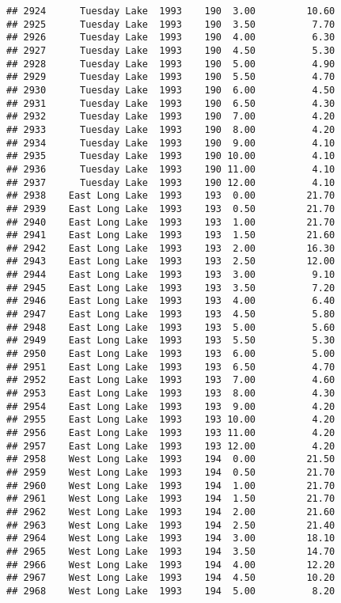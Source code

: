 \documentclass[
]{article}
\begin{document}
\begin{verbatim}
## 2924      Tuesday Lake  1993    190  3.00         10.60
## 2925      Tuesday Lake  1993    190  3.50          7.70
## 2926      Tuesday Lake  1993    190  4.00          6.30
## 2927      Tuesday Lake  1993    190  4.50          5.30
## 2928      Tuesday Lake  1993    190  5.00          4.90
## 2929      Tuesday Lake  1993    190  5.50          4.70
## 2930      Tuesday Lake  1993    190  6.00          4.50
## 2931      Tuesday Lake  1993    190  6.50          4.30
## 2932      Tuesday Lake  1993    190  7.00          4.20
## 2933      Tuesday Lake  1993    190  8.00          4.20
## 2934      Tuesday Lake  1993    190  9.00          4.10
## 2935      Tuesday Lake  1993    190 10.00          4.10
## 2936      Tuesday Lake  1993    190 11.00          4.10
## 2937      Tuesday Lake  1993    190 12.00          4.10
## 2938    East Long Lake  1993    193  0.00         21.70
## 2939    East Long Lake  1993    193  0.50         21.70
## 2940    East Long Lake  1993    193  1.00         21.70
## 2941    East Long Lake  1993    193  1.50         21.60
## 2942    East Long Lake  1993    193  2.00         16.30
## 2943    East Long Lake  1993    193  2.50         12.00
## 2944    East Long Lake  1993    193  3.00          9.10
## 2945    East Long Lake  1993    193  3.50          7.20
## 2946    East Long Lake  1993    193  4.00          6.40
## 2947    East Long Lake  1993    193  4.50          5.80
## 2948    East Long Lake  1993    193  5.00          5.60
## 2949    East Long Lake  1993    193  5.50          5.30
## 2950    East Long Lake  1993    193  6.00          5.00
## 2951    East Long Lake  1993    193  6.50          4.70
## 2952    East Long Lake  1993    193  7.00          4.60
## 2953    East Long Lake  1993    193  8.00          4.30
## 2954    East Long Lake  1993    193  9.00          4.20
## 2955    East Long Lake  1993    193 10.00          4.20
## 2956    East Long Lake  1993    193 11.00          4.20
## 2957    East Long Lake  1993    193 12.00          4.20
## 2958    West Long Lake  1993    194  0.00         21.50
## 2959    West Long Lake  1993    194  0.50         21.70
## 2960    West Long Lake  1993    194  1.00         21.70
## 2961    West Long Lake  1993    194  1.50         21.70
## 2962    West Long Lake  1993    194  2.00         21.60
## 2963    West Long Lake  1993    194  2.50         21.40
## 2964    West Long Lake  1993    194  3.00         18.10
## 2965    West Long Lake  1993    194  3.50         14.70
## 2966    West Long Lake  1993    194  4.00         12.20
## 2967    West Long Lake  1993    194  4.50         10.20
## 2968    West Long Lake  1993    194  5.00          8.20

\end{verbatim}
\end{document}
